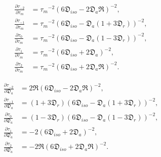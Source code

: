 \documentclass[a4paper,11pt,twoside,openright]{book}
\def\lthtmlcheckvsize{\ifdim\ht\sizebox<\vsize 
  \ifdim\wd\sizebox<\hsize\expandafter\hfill\fi \expandafter\vfill
  \else\expandafter\vss\fi}%
\begin{document}
{\newpage\clearpage
\setcounter{equation}{137}
%
\begin{subequations}\begin{align}
\frac{\partial \tau_{-2}}{\partial \tau_m} &= {\tau_m}^{-2} (6\mathfrak{D}_{iso} - 2\mathfrak{D}_a\mathfrak{R})^{-2}, \\
\frac{\partial \tau_{-1}}{\partial \tau_m} &= {\tau_m}^{-2} (6\mathfrak{D}_{iso} - \mathfrak{D}_a (1 + 3\mathfrak{D}_r))^{-2}, \\
\frac{\partial \tau_{0}}{\partial \tau_m}  &= {\tau_m}^{-2} (6\mathfrak{D}_{iso} - \mathfrak{D}_a (1 - 3\mathfrak{D}_r))^{-2}, \\
\frac{\partial \tau_{1}}{\partial \tau_m}  &= {\tau_m}^{-2} (6\mathfrak{D}_{iso} + 2\mathfrak{D}_a)^{-2}, \\
\frac{\partial \tau_{2}}{\partial \tau_m}  &= {\tau_m}^{-2} (6\mathfrak{D}_{iso} + 2\mathfrak{D}_a\mathfrak{R})^{-2}.
\end{align}\end{subequations}%
\lthtmldisplayZ
\lthtmlcheckvsize\clearpage}

{\newpage\clearpage
\setcounter{equation}{138}
%
\begin{subequations}\begin{align}
\frac{\partial \tau_{-2}}{\partial \mathfrak{D}_a} &= 2\mathfrak{R} (6\mathfrak{D}_{iso} - 2\mathfrak{D}_a\mathfrak{R})^{-2}, \\
\frac{\partial \tau_{-1}}{\partial \mathfrak{D}_a} &= (1 + 3\mathfrak{D}_r) (6\mathfrak{D}_{iso} - \mathfrak{D}_a (1 + 3\mathfrak{D}_r))^{-2}, \\
\frac{\partial \tau_{0}}{\partial \mathfrak{D}_a}  &= (1 - 3\mathfrak{D}_r) (6\mathfrak{D}_{iso} - \mathfrak{D}_a (1 - 3\mathfrak{D}_r))^{-2}, \\
\frac{\partial \tau_{1}}{\partial \mathfrak{D}_a}  &= -2 (6\mathfrak{D}_{iso} + 2\mathfrak{D}_a)^{-2}, \\
\frac{\partial \tau_{2}}{\partial \mathfrak{D}_a}  &= -2\mathfrak{R} (6\mathfrak{D}_{iso} + 2\mathfrak{D}_a\mathfrak{R})^{-2}.
\end{align}\end{subequations}%
\lthtmldisplayZ
\lthtmlcheckvsize\clearpage}
\end{document}
